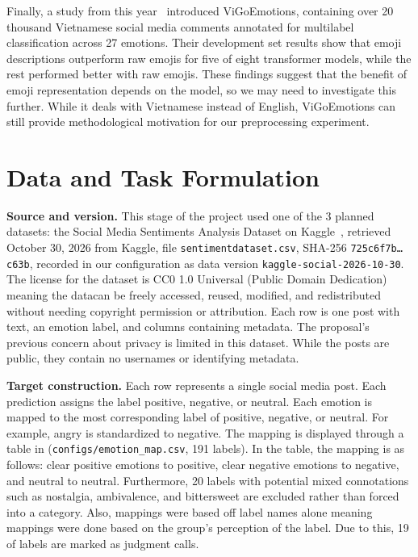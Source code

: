 \documentclass[sigconf,nonacm]{acmart}
\begin{document}
Finally, a study from this year~\cite{tran2026vigoemotions} introduced ViGoEmotions, containing over 20 thousand Vietnamese social media comments annotated for multilabel classification across 27 emotions.  Their development set results show that emoji descriptions outperform raw emojis for five of eight transformer models, while the rest performed better with raw emojis.  These findings suggest that the benefit of emoji representation depends on the model, so we may need to investigate this further.  While it deals with Vietnamese instead of English, ViGoEmotions can still provide methodological motivation for our preprocessing experiment.



\section{Data and Task Formulation}

\textbf{Source and version.} 
This stage of the project used one of the 3 planned datasets: the Social Media Sentiments Analysis Dataset on Kaggle~\cite{parmar_social_media_sentiments}, retrieved October 30, 2026 from Kaggle, file \texttt{sentimentdataset.csv}, SHA-256 \texttt{725c6f7b\ldots c63b}, recorded in our configuration as data version \texttt{kaggle-social-2026-10-30}. The license for the dataset is CC0 1.0 Universal (Public Domain Dedication) meaning the datacan be freely accessed, reused, modified, and redistributed without needing copyright permission or attribution. Each row is one post with text, an emotion label, and columns containing metadata. The proposal's previous concern about privacy is limited in this dataset. While the posts are public, they contain no usernames or identifying metadata.

\textbf{Target construction.}
Each row represents a single social media post.  Each prediction assigns the label positive, negative, or neutral.  Each emotion is mapped to the most corresponding label of positive, negative, or neutral. For example, angry is standardized to negative. The mapping is displayed through a table in (\texttt{configs/emotion\_map.csv}, 191 labels). In the table, the mapping is as follows: clear positive emotions to positive, clear negative emotions to negative, and neutral to neutral. Furthermore, 20 labels with potential mixed connotations such as nostalgia, ambivalence, and bittersweet are excluded rather than forced into a category. Also, mappings were based off label names alone meaning mappings were done based on the group's perception of the label. Due to this, 19 of labels are marked as judgment calls. 
\end{document}
